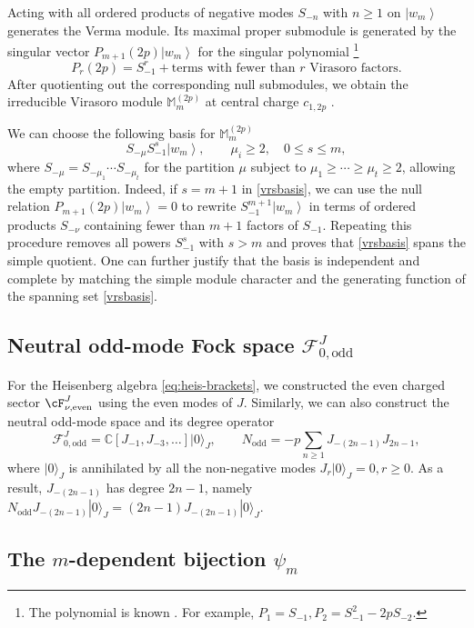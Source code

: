 \documentclass[a4paper,11pt]{article}
\theoremstyle{definition}
\theoremstyle{definition}
\theoremstyle{remark}
\newcommand{\ket}[1]{\ensuremath{\left|#1\right\rangle}}
\newcommand{\be}{\begin{equation}}
\newcommand{\ee}{\end{equation}}
\newcommand{\C}{\mathbb C}
\begin{document}
 Acting with all ordered products of negative modes $S_{-n}$ with $n\geq1$ on $\ket{w_m}$ generates the Verma module.  
 Its maximal proper submodule is generated by the singular vector      $P_{m+1}(2p)\ket{w_m}$ for the  singular
polynomial  \cite{Adamovic:2025efe}  \footnote{The polynomial is known  \cite{BENOIT1988517}. For example,  
$P_1=S_{-1},  P_2=S_{-1}^2-2pS_{-2}$.}
\be\label{Prsfs}
P_r(2p)=S_{-1}^r
+\text{terms with fewer than $r$ Virasoro factors}.
\ee
After quotienting out   the corresponding  null submodules,  we obtain the irreducible Virasoro module $\mathbb M_m^{(2p)}$ at central charge $c_{1,2p}$ \cite{Adamovic:2020lvj}.

 
We can choose the following basis for $\mathbb M_m^{(2p)}$    
\be 
S_{-\mu}S_{-1}^s\ket{w_m},
\qquad \mu_i\geq2,\quad 0\leq s\leq m,
\label{vrsbasis}
\ee
%
where $S_{-\mu}=S_{-\mu_1}\cdots S_{-\mu_t}$ for the partition $\mu$ subject to 
$\mu_1\geq\cdots\geq\mu_t\geq2$, allowing the empty partition.
 Indeed, if $s=m+1$ in \eqref{vrsbasis}, we can use the null relation $P_{m+1}(2p)\ket{w_m}=0$ to rewrite $S_{-1}^{m+1}\ket{w_m}$ in terms of  
 ordered products $S_{-\nu}$ containing fewer than $m+1$ factors of $S_{-1}$. Repeating this procedure removes all powers $S_{-1}^s$ with $s>m$ and proves that \eqref{vrsbasis} spans the simple quotient.  One can   further justify that the basis is independent and complete by matching the simple module character  and the  generating function of the   spanning set \eqref{vrsbasis}.
 
 
 
 
 

 

\subsection*{Neutral odd-mode Fock space $\mathcal F^J_{0,\mathrm{odd}}$}
For the Heisenberg algebra  \eqref{eq:heis-brackets}, we constructed the even charged  sector $\cF_{\nu,\mathrm{even}}^J$  using the even modes of $J$. Similarly, we can also construct the   neutral odd-mode space and its degree operator
\be\label{OddFock}
\mathcal F^J_{0,\mathrm{odd}}
=\C[J_{-1},J_{-3},\ldots]|0\rangle_J,
\qquad
N_{\mathrm{odd}}
=-p\sum_{n\geq1}J_{-(2n-1)}J_{2n-1},
\ee
where  $ |0\rangle_J$ is annihilated by all the non-negative    modes   $J_r|0\rangle_J=0, r\ge 0$.
As a result,  $J_{-(2n-1)}$ has degree $2n-1$, namely $N_{\mathrm{odd}}J_{-(2n-1)}|0\rangle_J=(2n-1) J_{-(2n-1)}|0\rangle_J$.
 
\subsection*{The $m$-dependent bijection $\psi_m$}
\label{sec:m-map}
\end{document}
